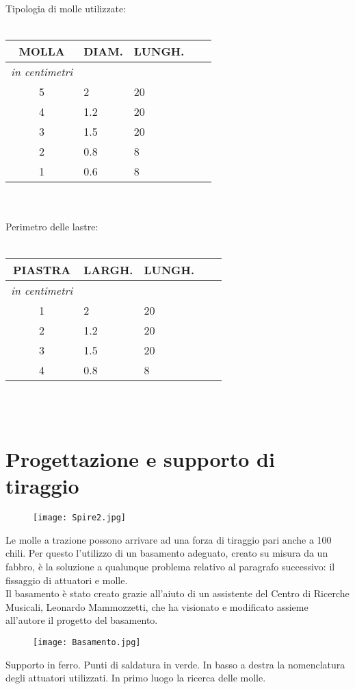 Tipologia di molle utilizzate:
\\ \\
\begin{tabular}{cp{2cm}p{2cm}p{.2cm}p{2cm}} \textbf{MOLLA}&\textbf{DIAM.}&\textbf{LUNGH.}\\
\hline \textit{in centimetri} \\
\hline 5&2&20\\
\hline 4&1.2&20\\
\hline 3&1.5&20\\
\hline 2&0.8&8\\
\hline 1&0.6&8\\
\end{tabular}
\\ \\
Perimetro delle lastre:
\\ \\
\begin{tabular}{cp{2cm}p{2cm}p{.2cm}p{2cm}} \textbf{PIASTRA}&\textbf{LARGH.}&\textbf{LUNGH.}\\
\hline \textit{in centimetri} \\
\hline 1&2&20\\
\hline 2&1.2&20\\
\hline 3&1.5&20\\
\hline 4&0.8&8\\
\end{tabular}
\\ \\

\section{Progettazione e supporto di tiraggio}

 \begin{figure}[htbp]
        \centering
        \texttt{[image: Spire2.jpg]}
\end{figure}

Le molle a trazione possono arrivare ad una forza di tiraggio pari anche a 100 chili. Per questo l'utilizzo di un basamento adeguato, creato su misura da un fabbro, è la soluzione a qualunque problema relativo al paragrafo successivo: il fissaggio di attuatori e molle.\\


Il basamento è stato creato grazie all'aiuto di un assistente del Centro di Ricerche Musicali, Leonardo Mammozzetti, che ha visionato e modificato assieme all'autore il progetto del basamento.  \begin{figure}[htbp]
        \centering
        \texttt{[image: Basamento.jpg]}
\end{figure}
Supporto in ferro. Punti di saldatura in verde. In basso a destra la nomenclatura degli attuatori utilizzati.
In primo luogo la ricerca delle molle.

